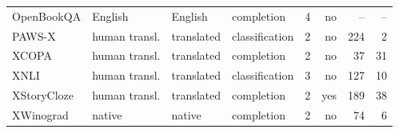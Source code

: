 \begin{tabular}{lllllrrr}
OpenBookQA & English & English & completion & 4 & no & -- & -- \\
PAWS-X & human transl. & translated & classification & 2 & no & 224 & 2 \\
XCOPA & human transl. & translated & completion & 2 & no & 37 & 31 \\
XNLI & human transl. & translated & classification & 3 & no & 127 & 10 \\
XStoryCloze & human transl. & translated & completion & 2 & yes & 189 & 38 \\
XWinograd & native & native & completion & 2 & no & 74 & 6 \\
\bottomrule
\end{tabular}
